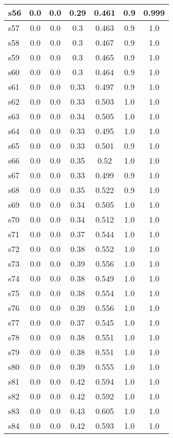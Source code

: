 \documentclass{article}
\begin{document}
\begin{tabular}{|l|c|c|c|c|c|c|}
\hline
s56 &0.0 & 0.0 & 0.29 & 0.461 & 0.9 & 0.999\\
\hline
s57 &0.0 & 0.0 & 0.3 & 0.463 & 0.9 & 1.0\\
\hline
s58 &0.0 & 0.0 & 0.3 & 0.467 & 0.9 & 1.0\\
\hline
s59 &0.0 & 0.0 & 0.3 & 0.465 & 0.9 & 1.0\\
\hline
s60 &0.0 & 0.0 & 0.3 & 0.464 & 0.9 & 1.0\\
\hline
s61 &0.0 & 0.0 & 0.33 & 0.497 & 0.9 & 1.0\\
\hline
s62 &0.0 & 0.0 & 0.33 & 0.503 & 1.0 & 1.0\\
\hline
s63 &0.0 & 0.0 & 0.34 & 0.505 & 1.0 & 1.0\\
\hline
s64 &0.0 & 0.0 & 0.33 & 0.495 & 1.0 & 1.0\\
\hline
s65 &0.0 & 0.0 & 0.33 & 0.501 & 0.9 & 1.0\\
\hline
s66 &0.0 & 0.0 & 0.35 & 0.52 & 1.0 & 1.0\\
\hline
s67 &0.0 & 0.0 & 0.33 & 0.499 & 0.9 & 1.0\\
\hline
s68 &0.0 & 0.0 & 0.35 & 0.522 & 0.9 & 1.0\\
\hline
s69 &0.0 & 0.0 & 0.34 & 0.505 & 1.0 & 1.0\\
\hline
s70 &0.0 & 0.0 & 0.34 & 0.512 & 1.0 & 1.0\\
\hline
s71 &0.0 & 0.0 & 0.37 & 0.544 & 1.0 & 1.0\\
\hline
s72 &0.0 & 0.0 & 0.38 & 0.552 & 1.0 & 1.0\\
\hline
s73 &0.0 & 0.0 & 0.39 & 0.556 & 1.0 & 1.0\\
\hline
s74 &0.0 & 0.0 & 0.38 & 0.549 & 1.0 & 1.0\\
\hline
s75 &0.0 & 0.0 & 0.38 & 0.554 & 1.0 & 1.0\\
\hline
s76 &0.0 & 0.0 & 0.39 & 0.556 & 1.0 & 1.0\\
\hline
s77 &0.0 & 0.0 & 0.37 & 0.545 & 1.0 & 1.0\\
\hline
s78 &0.0 & 0.0 & 0.38 & 0.551 & 1.0 & 1.0\\
\hline
s79 &0.0 & 0.0 & 0.38 & 0.551 & 1.0 & 1.0\\
\hline
s80 &0.0 & 0.0 & 0.39 & 0.555 & 1.0 & 1.0\\
\hline
s81 &0.0 & 0.0 & 0.42 & 0.594 & 1.0 & 1.0\\
\hline
s82 &0.0 & 0.0 & 0.42 & 0.592 & 1.0 & 1.0\\
\hline
s83 &0.0 & 0.0 & 0.43 & 0.605 & 1.0 & 1.0\\
\hline
s84 &0.0 & 0.0 & 0.42 & 0.593 & 1.0 & 1.0\\

\end{tabular}
\end{document}
